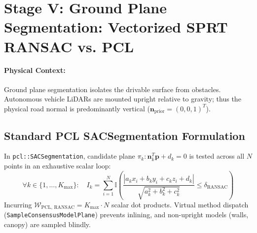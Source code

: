 \documentclass[11pt,a4paper]{article}
\begin{document}
\section{Stage V: Ground Plane Segmentation: Vectorized SPRT RANSAC vs. PCL}
\label{sec:ransac_math}

\paragraph{Physical Context:} Ground plane segmentation isolates the drivable surface from obstacles. Autonomous vehicle LiDARs are mounted upright relative to gravity; thus the physical road normal is predominantly vertical ($\bm{n}_{\text{prior}} = (0, 0, 1)^T$).

\subsection{Standard PCL SACSegmentation Formulation}
In \texttt{pcl::SACSegmentation}, candidate plane $\pi_k: \bm{n}_k^T \bm{p} + d_k = 0$ is tested across all $N$ points in an exhaustive scalar loop:
\begin{equation}
\forall k \in \{1, \dots, K_{\max}\}: \quad I_k = \sum_{i=1}^{N} \mathbb{I}\left( \frac{\left| a_k x_i + b_k y_i + c_k z_i + d_k \right|}{\sqrt{a_k^2 + b_k^2 + c_k^2}} \le \delta_{\text{RANSAC}} \right)
\label{eq:pcl_ransac_math}
\end{equation}
Incurring $\mathcal{W}_{\text{PCL, RANSAC}} = K_{\max} \cdot N$ scalar dot products. Virtual method dispatch (\texttt{SampleConsensusModelPlane}) prevents inlining, and non-upright models (walls, canopy) are sampled blindly.
\end{document}
